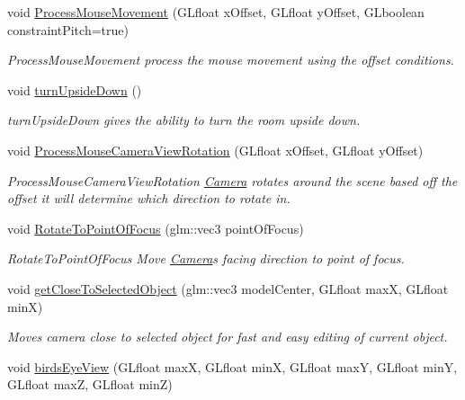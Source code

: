 \begin{DoxyCompactItemize}
void \hyperlink{class_camera_ad74e2911d43fe9f34f42499b5180a362}{Process\+Mouse\+Movement} (G\+Lfloat x\+Offset, G\+Lfloat y\+Offset, G\+Lboolean constraint\+Pitch=true)
\begin{DoxyCompactList}\small\item\em Process\+Mouse\+Movement process the mouse movement using the offset conditions. \end{DoxyCompactList}\item 
void \hyperlink{class_camera_a7e93caf3e55100a7507714d7eeec223e}{turn\+Upside\+Down} ()
\begin{DoxyCompactList}\small\item\em turn\+Upside\+Down gives the ability to turn the room upside down. \end{DoxyCompactList}\item 
void \hyperlink{class_camera_a58246ec7f4f0852005e09c8ab8f54642}{Process\+Mouse\+Camera\+View\+Rotation} (G\+Lfloat x\+Offset, G\+Lfloat y\+Offset)
\begin{DoxyCompactList}\small\item\em Process\+Mouse\+Camera\+View\+Rotation \hyperlink{class_camera}{Camera} rotates around the scene based off the offset it will determine which direction to rotate in. \end{DoxyCompactList}\item 
void \hyperlink{class_camera_aa8bb7760c16698825004048c4c033ada}{Rotate\+To\+Point\+Of\+Focus} (glm\+::vec3 point\+Of\+Focus)
\begin{DoxyCompactList}\small\item\em Rotate\+To\+Point\+Of\+Focus Move \hyperlink{class_camera}{Camera}\textquotesingle{}s facing direction to point of focus. \end{DoxyCompactList}\item 
\hypertarget{class_camera_a875c97e044ea5069d07476652d1cde41}{}void \hyperlink{class_camera_a875c97e044ea5069d07476652d1cde41}{get\+Close\+To\+Selected\+Object} (glm\+::vec3 model\+Center, G\+Lfloat max\+X, G\+Lfloat min\+X)\label{class_camera_a875c97e044ea5069d07476652d1cde41}

\begin{DoxyCompactList}\small\item\em Moves camera close to selected object for fast and easy editing of current object. \end{DoxyCompactList}\item 
\hypertarget{class_camera_a9f7fab48637e55f780cfbc55844cb611}{}void \hyperlink{class_camera_a9f7fab48637e55f780cfbc55844cb611}{birds\+Eye\+View} (G\+Lfloat max\+X, G\+Lfloat min\+X, G\+Lfloat max\+Y, G\+Lfloat min\+Y, G\+Lfloat max\+Z, G\+Lfloat min\+Z)\label{class_camera_a9f7fab48637e55f780cfbc55844cb611}


\end{DoxyCompactItemize}
